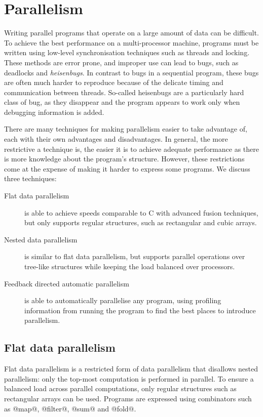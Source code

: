 \section{Parallelism}
Writing parallel programs that operate on a large amount of data can be difficult.
To achieve the best performance on a multi-processor machine, programs must be written using low-level synchronisation techniques such as threads and locking.
These methods are error prone, and improper use can lead to bugs, such as deadlocks and \emph{heisenbugs}.
In contrast to bugs in a sequential program, these bugs are often much harder to reproduce because of the delicate timing and communication between threads.
So-called heisenbugs are a particularly hard class of bug, as they disappear and the program appears to work only when debugging information is added.

There are many techniques for making parallelism easier to take advantage of,
each with their own advantages and disadvantages.
In general, the more restrictive a technique is, the easier it is to achieve adequate performance
as there is more knowledge about the program's structure.
However, these restrictions come at the expense of making it harder to express some programs.
We discuss three techniques:

\begin{description}
\item[Flat   data parallelism]
is able to achieve speeds comparable to C with advanced fusion techniques,
but only supports regular structures, such as rectangular and cubic arrays.

\item[Nested data parallelism]
is similar to flat data parallelism,
but supports parallel operations over tree-like structures
while keeping the load balanced over processors.

\item[Feedback directed automatic parallelism]
is able to automatically parallelise any program,
using profiling information from running the program
to find the best places to introduce parallelism. 
\end{description}


\subsection{Flat data parallelism}
Flat data parallelism is a restricted form of data parallelism that disallows nested parallelism:
only the top-most computation is performed in parallel.
To ensure a balanced load across parallel computations, only regular structures such as rectangular arrays can be used.
Programs are expressed using combinators such as @map@, @filter@, @sum@ and @fold@.

